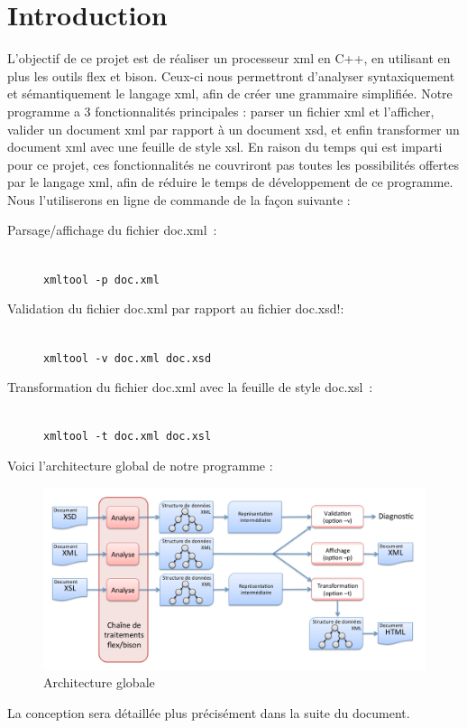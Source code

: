 \chapter{Introduction}

L'objectif de ce projet est de réaliser un processeur xml en C++, en utilisant en plus les outils flex et bison. Ceux-ci nous permettront d'analyser syntaxiquement et sémantiquement le langage xml, afin de créer une grammaire simplifiée. Notre programme a 3 fonctionnalités principales : parser un fichier xml et l'afficher, valider un document xml par rapport à un document xsd, et enfin transformer un document xml avec une feuille de style xsl. En raison du temps qui est imparti pour ce projet, ces fonctionnalités ne couvriront pas toutes les possibilités offertes par le langage xml, afin de réduire le temps de développement de ce programme. \\
Nous l'utiliserons en ligne de commande de la façon suivante :
\begin{description}
    \item[Parsage/affichage du fichier doc.xml~:] ~\\
        \lstinline$xmltool -p doc.xml$
    \item[Validation du fichier doc.xml par rapport au fichier doc.xsd!:] ~\\
        \lstinline$xmltool -v doc.xml doc.xsd$
    \item[Transformation du fichier doc.xml avec la feuille de style doc.xsl~:]~\\
        \lstinline$xmltool -t doc.xml doc.xsl$ \\
\end{description}

Voici l'architecture global de notre programme :

    \begin{figure}[h!]
        \centering
        \includegraphics[width=0.8\linewidth]{images/archi.png}
        \caption{Architecture globale}
        \label{classDiagram}
    \end{figure}

La conception sera détaillée plus précisément dans la suite du document.
